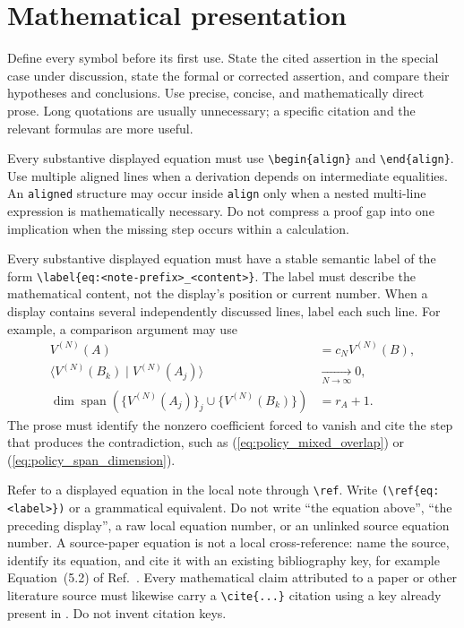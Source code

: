 \documentclass{article}
\providecommand{\braket}[2]{\langle #1\mid #2\rangle}
\begin{document}
\section{Mathematical presentation}

Define every symbol before its first use. State the cited assertion in the
special case under discussion, state the formal or corrected assertion, and
compare their hypotheses and conclusions. Use precise, concise, and
mathematically direct prose. Long quotations are usually unnecessary; a
specific citation and the relevant formulas are more useful.

Every substantive displayed equation must use
\verb|\begin{align}| and \verb|\end{align}|. Use multiple aligned lines when a
derivation depends on intermediate equalities. An \verb|aligned| structure may
occur inside \verb|align| only when a nested multi-line expression is
mathematically necessary. Do not compress a proof gap into one implication when
the missing step occurs within a calculation.

Every substantive displayed equation must have a stable semantic label of the
form \verb|\label{eq:<note-prefix>_<content>}|. The label must describe the
mathematical content, not the display's position or current number. When a
display contains several independently discussed lines, label each such line.
For example, a comparison argument may use
\begin{align}
    V^{(N)}(A)
        &= c_N V^{(N)}(B),
    \label{eq:policy_proportional_vectors}\\
    \braket{V^{(N)}(B_k)}{V^{(N)}(A_j)}
        &\xrightarrow[N\to\infty]{}0,
    \label{eq:policy_mixed_overlap}\\
    \dim\operatorname{span}
        \left(\{V^{(N)}(A_j)\}_j\cup\{V^{(N)}(B_k)\}\right)
        &= r_A+1.
    \label{eq:policy_span_dimension}
\end{align}
The prose must identify the nonzero coefficient forced to vanish and cite the
step that produces the contradiction, such as
(\ref{eq:policy_mixed_overlap}) or
(\ref{eq:policy_span_dimension}).

Refer to a displayed equation in the local note through \verb|\ref|. Write
\verb|(\ref{eq:<label>})| or a grammatical equivalent. Do not write ``the
equation above'', ``the preceding display'', a raw local equation number, or an
unlinked source equation number. A source-paper equation is not a local
cross-reference: name the source, identify its equation, and cite it with an
existing bibliography key, for example Equation~(5.2) of
Ref.~\cite{Wolf2012Quantum}. Every mathematical claim attributed to a paper or
other literature source must likewise carry a \verb|\cite{...}| citation using
a key already present in . Do not invent citation keys.
\end{document}
